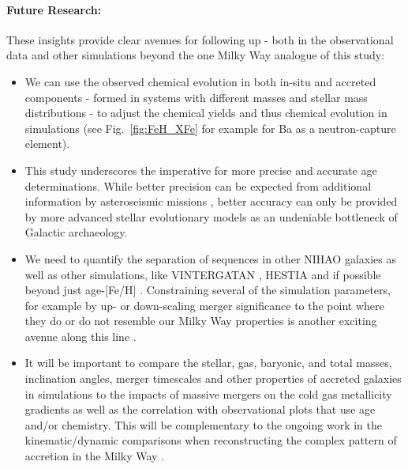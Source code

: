 \documentclass[fleqn,usenatbib]{mnras}
\begin{document}
\paragraph*{Future Research:}
These insights provide clear avenues for following up - both in the observational data and other simulations beyond the one Milky Way analogue of this study:
\begin{itemize}
    \item We can use the observed chemical evolution in both in-situ and accreted components - formed in systems with different masses and stellar mass distributions - to adjust the chemical yields and thus chemical evolution in simulations (see Fig.~\ref{fig:FeH_XFe} for example for Ba as a neutron-capture element).
    \item This study underscores the imperative for more precise and accurate age determinations. While better precision can be expected from additional information by asteroseismic missions \citep[see e.g.][]{Miglio2017,Mackereth2021}, better accuracy can only be provided by more advanced stellar evolutionary models \citep[see also][]{Kim2002, Schuster2012} as an undeniable bottleneck of Galactic archaeology.
    \item We need to quantify the separation of sequences in other NIHAO galaxies \citep[see e.g.][]{Lu2022, Buck2023} as well as other simulations, like \textsc{VINTERGATAN} \citep{Renaud2021, Renaud2021b, Agertz2021}, \textsc{HESTIA} \citep{Khoperskov2023, Khoperskov2023b, Khoperskov2023c} and if possible beyond just age-[Fe/H] \citep{Khoperskov2023c}. Constraining several of the simulation parameters, for example by up- or down-scaling merger significance to the point where they do or do not resemble our Milky Way properties is another exciting avenue along this line \cite{Rey2023}.
    \item It will be important to compare the stellar, gas, baryonic, and total masses, inclination angles, merger timescales and other properties of accreted galaxies in simulations to the impacts of massive mergers on the cold gas metallicity gradients \citep{Buck2023} as well as the correlation with observational plots that use age and/or chemistry. This will be complementary to the ongoing work in the kinematic/dynamic comparisons \citep[e.g.][]{Naidu2021, Khoperskov2023b} when reconstructing the complex pattern of accretion in the Milky Way \citep{Naidu2020}.
\end{itemize}
\end{document}
